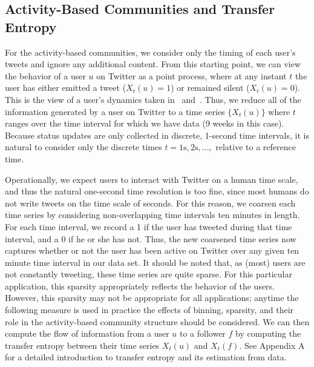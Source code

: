 \subsection{Activity-Based Communities and Transfer Entropy}
\label{sec:method-activity}






For the activity-based communities, we consider only the timing of each user's tweets and ignore any additional content. From this starting point, we can view the behavior of a user $u$ on Twitter as a point process, where at any instant $t$ the user has either emitted a tweet ($X_{t}(u) = 1$) or remained silent ($X_{t}(u) = 0$). This is the view of a user's dynamics taken in~\cite{darmon2013understanding} and~\cite{ver2012information}. Thus, we reduce all of the information generated by a user on Twitter to a time series $\{ X_{t}(u)\}$ where $t$ ranges over the time interval for which we have data (9 weeks in this case). Because status updates are only collected in discrete, 1-second time intervals, it is natural to consider only the discrete times $t = 1 \text{s}, 2 \text{s}, \ldots, $ relative to a reference time. 

Operationally, we expect users to interact with Twitter on a human time scale, and thus the natural one-second time resolution is too fine, since most humans do not write tweets on the time scale of seconds. For this reason, we coarsen each time series by considering non-overlapping time intervals ten minutes in length. For each time interval, we record a 1 if the user has tweeted during that time interval, and a 0 if he or she has not. Thus, the new coarsened time series now captures whether or not the user has been active on Twitter over any given ten minute time interval in our data set. It should be noted that, as (most) users are not constantly tweeting, these time series are quite sparse. For this particular application, this sparsity appropriately reflects the behavior of the users. However, this sparsity may not be appropriate for all applications; anytime the following measure is used in practice the effects of binning, sparsity, and their role in the activity-based community structure should be considered. We can then compute the flow of information from a user  $u$ to a follower $f$ by computing the transfer entropy between their time series $X_{t}(u)$ and $X_{t}(f).$ See Appendix A for a detailed introduction to transfer entropy and its estimation from data.

